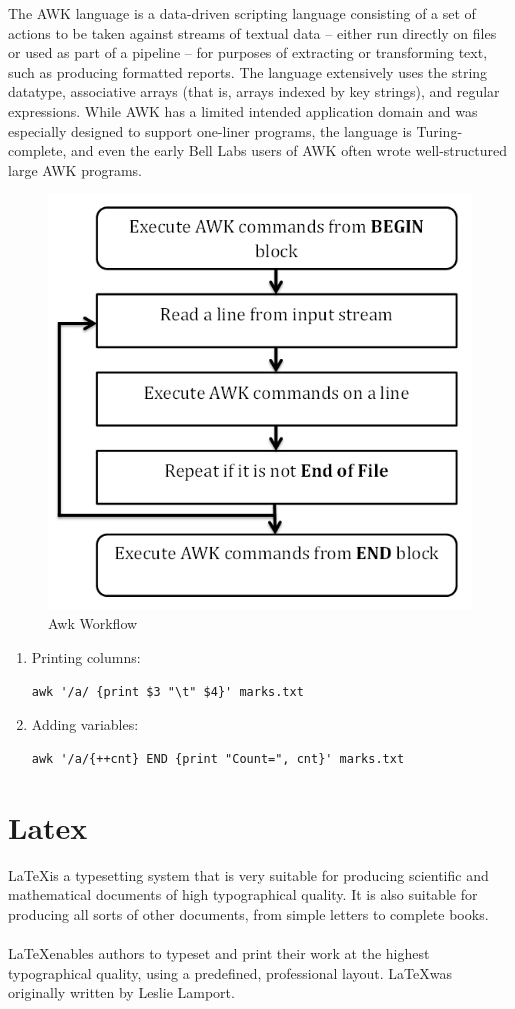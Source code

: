 \documentclass{article}
\begin{document}
The AWK language is a data-driven scripting language consisting of a set of actions to be taken against streams of textual data – either run directly on files or used as part of a pipeline – for purposes of extracting or transforming text, such as producing formatted reports. The language extensively uses the string datatype, associative arrays (that is, arrays indexed by key strings), and regular expressions. While AWK has a limited intended application domain and was especially designed to support one-liner programs, the language is Turing-complete, and even the early Bell Labs users of AWK often wrote well-structured large AWK programs.
\begin{figure}[!h]
	\begin{center}
		\includegraphics[width=0.4\columnwidth]{awk_workflow}
	\end{center}
	\caption{Awk Workflow}
        \label{fig:shapes}
\end{figure}
    \begin{enumerate}
        \item
            Printing columns:
                \begin{lstlisting}[style=BashInputStyle]
                     awk '/a/ {print $3 "\t" $4}' marks.txt 
                \end{lstlisting}
        \item
            Adding variables:
                \begin{lstlisting}[style=BashInputStyle]
                     awk '/a/{++cnt} END {print "Count=", cnt}' marks.txt
                \end{lstlisting}
  \end{enumerate}
\section{Latex}
	\LaTeX is a typesetting system that is very suitable for producing scientific and mathematical documents of high typographical quality. It is also suitable for producing all sorts of other documents, from simple letters to complete books.\\
	\\
	\LaTeX enables authors to typeset and print their work at the highest typographical quality, using a predefined, professional layout. \LaTeX was originally written by Leslie Lamport.\\
	
\end{document}
